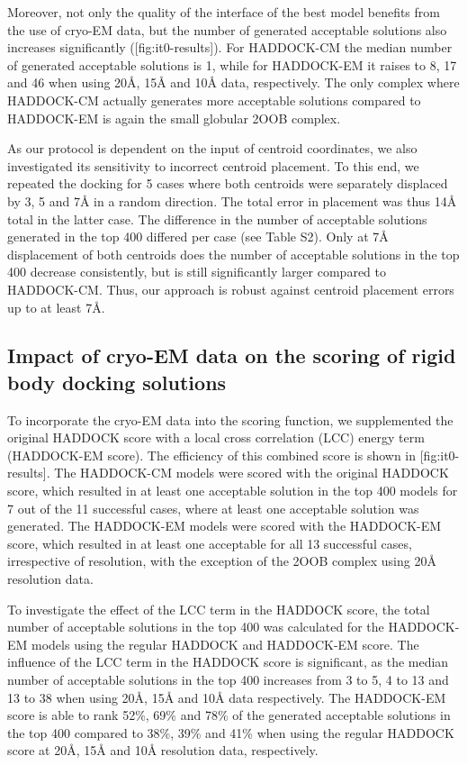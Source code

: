 Moreover, not only the quality of the interface of the best model benefits from the use of cryo-EM data, but the number of generated acceptable solutions also increases significantly ([fig:it0-results]).
For HADDOCK-CM the median number of generated acceptable solutions is 1, while for HADDOCK-EM it raises to 8, 17 and 46 when using 20Å, 15Å and 10Å data, respectively. 
The only complex where HADDOCK-CM actually generates more acceptable solutions compared to HADDOCK-EM is again the small globular 2OOB complex.

As our protocol is dependent on the input of centroid coordinates, we also investigated its sensitivity to incorrect centroid placement. 
To this end, we repeated the docking for 5 cases where both centroids were separately displaced by 3, 5 and 7Å in a random direction. 
The total error in placement was thus 14Å total in the latter case. The difference in the number of acceptable solutions generated in the top 400 differed per case (see Table S2). 
Only at 7Å displacement of both centroids does the number of acceptable solutions in the top 400 decrease consistently, but is still significantly larger compared to HADDOCK-CM. 
Thus, our approach is robust against centroid placement errors up to at least 7Å.

\subsection{Impact of cryo-EM data on the scoring of rigid body docking solutions}

{}

To incorporate the cryo-EM data into the scoring function, we supplemented the original HADDOCK score with a local cross correlation (LCC) energy term (HADDOCK-EM score). 
The efficiency of this combined score is shown in [fig:it0-results].
The HADDOCK-CM models were scored with the original HADDOCK score, which resulted in at least one acceptable solution in the top 400 models for 7 out of the 11 successful cases, where at least one acceptable solution was generated. 
The HADDOCK-EM models were scored with the HADDOCK-EM score, which resulted in at least one acceptable for all 13 successful cases, irrespective of resolution, with the exception of the 2OOB complex using 20Å resolution data. 

To investigate the effect of the LCC term in the HADDOCK score, the total number of acceptable solutions in the top 400 was calculated for the HADDOCK-EM models using the regular HADDOCK and HADDOCK-EM score. 
The influence of the LCC term in the HADDOCK score is significant, as the median number of acceptable solutions in the top 400 increases from 3 to 5, 4 to 13 and 13 to 38 when using 20Å, 15Å and 10Å data respectively. 
The HADDOCK-EM score is able to rank 52\%, 69\% and 78\% of the generated acceptable solutions in the top 400 compared to 38\%, 39\% and 41\% when using the regular HADDOCK score at 20Å, 15Å and 10Å resolution data, respectively.

